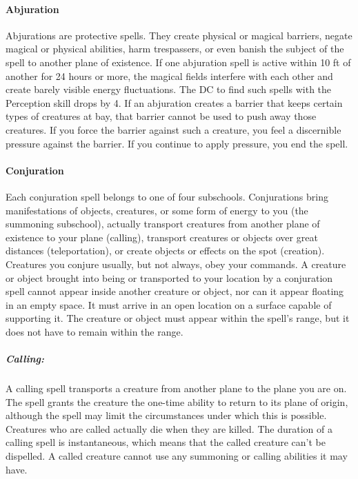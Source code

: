 \documentclass[../VancianToPsionics.tex]{subfiles}
\begin{document}
\paragraph{Abjuration}
Abjurations are protective spells. They create physical or magical barriers, negate magical or physical abilities, harm trespassers, or even banish the subject of the spell to another plane of existence.
If one abjuration spell is active within 10 ft of another for 24 hours or more, the magical fields interfere with each other and create barely visible energy fluctuations. The DC to find such spells with the Perception skill drops by 4.
If an abjuration creates a barrier that keeps certain types of creatures at bay, that barrier cannot be used to push away those creatures. 
If you force the barrier against such a creature, you feel a discernible pressure against the barrier. 
If you continue to apply pressure, you end the spell.
\paragraph{Conjuration}
Each conjuration spell belongs to one of four subschools. 
Conjurations bring manifestations of objects, creatures, or some form of energy to you (the summoning subschool), actually transport creatures from another plane of existence to your plane (calling), transport creatures or objects over great distances (teleportation), or create objects or effects on the spot (creation). 
Creatures you conjure usually, but not always, obey your commands.
A creature or object brought into being or transported to your location by a conjuration spell cannot appear inside another creature or object, nor can it appear floating in an empty space. It must arrive in an open location on a surface capable of supporting it.
The creature or object must appear within the spell's range, but it does not have to remain within the range.

\subparagraph{Calling:}
A calling spell transports a creature from another plane to the plane you are on. 
The spell grants the creature the one-time ability to return to its plane of origin, 
although the spell may limit the circumstances under which this is possible. 
Creatures who are called actually die when they are killed.
The duration of a calling spell is instantaneous, which means that the called creature can't be dispelled.
A called creature cannot use any summoning or calling abilities it may have.
\end{document}

